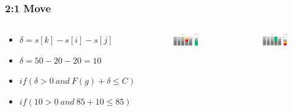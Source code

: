\documentclass{beamer}
\begin{document}
\begin{frame}
\frametitle{2:1 Move}
\begin{columns}[c] %
\begin{footnotesize}
\begin{itemize}
\item $\delta = s[k]-s[i]-s[j]$
\item $\delta = 50 - 20 - 20 = 10$
\item $if(\delta > 0 \ and \ F(g)+\delta \leq C)$
\item $if(10 > 0 \ and \ 85+10 \leq 85)$
\end{itemize}
\end{footnotesize}
\begin{figure}[!htbp]
\begin{center}
\includegraphics[scale=0.15]{img/Zwei_Eins_Move_1.png}
\end{center}
\label{fig:architecture}
\end{figure}
\begin{figure}[!htbp]
\begin{center}
\includegraphics[scale=0.15]{img/Zwei_Eins_Move_2.png}
\end{center}
\label{fig:architecture}
\end{figure}
\end{columns}
\end{frame}
\end{document}
